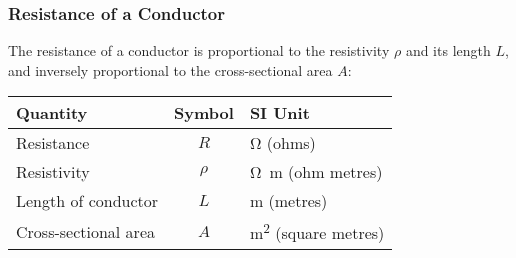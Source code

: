 \documentclass[12pt,aspectratio=169]{beamer}
\newcommand{\eq}[2]{\vspace{#1}{\Large\begin{displaymath}#2\end{displaymath}}}
\begin{document}
\begin{frame}
  \frametitle{Resistance of a Conductor}
  The resistance of a conductor is proportional to the resistivity $\rho$ and
  its length $L$, and inversely proportional to the cross-sectional area $A$:

  \eq{-.2in}{
    \boxed{R = \rho\frac{L}{A}}
  }

  \begin{center}
    \begin{tabular}{l|c|l}
      \rowcolor{pink}
      \textbf{Quantity} & \textbf{Symbol} & \textbf{SI Unit} \\ \hline
      Resistance           & $R$    & \si{\ohm} (ohms) \\
      Resistivity          & $\rho$ & \si{\ohm.\metre} (ohm metres) \\
      Length of conductor  & $L$    & \si{\metre} (metres) \\
      Cross-sectional area & $A$    & \si{\metre^2} (square metres) \\
    \end{tabular}
  \end{center}
\end{frame}
\end{document}

